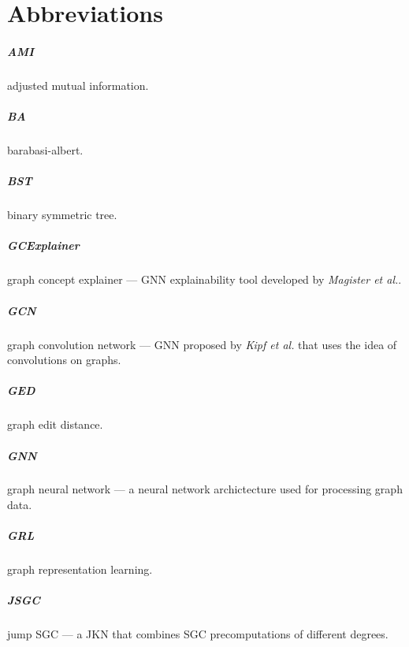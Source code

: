 \chapter{Abbreviations}

\paragraph{AMI}
adjusted mutual information.

\paragraph{BA}
barabasi-albert.

\paragraph{BST}
binary symmetric tree.

\paragraph{GCExplainer}
graph concept explainer --- GNN explainability tool developed by \textit{Magister et al.}\cite{magister2021gcexplainer}.

\paragraph{GCN}
graph convolution network --- GNN proposed by \textit{Kipf et al.}\cite{kipf2016semi} that uses the idea of convolutions on graphs.

\paragraph{GED}
graph edit distance.

\paragraph{GNN}
graph neural network --- a neural network archictecture used for processing graph data.

\paragraph{GRL}
graph representation learning.

\paragraph{JSGC}
jump SGC --- a JKN that combines SGC precomputations of different degrees.

